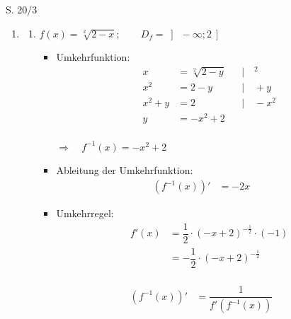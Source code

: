 \begin{Exercise}{S. 20/3}{}
    \begin{enumerate}
        \item [3.]\begin{enumerate}[label=\alph*)]
            \item[a)] {
                $f(x) = \sqrt[2]{2 -x}; \qquad D_{f} = \left] \ -\infty; 2 \ \right]$\\[-2.0ex]
                \begin{itemize}[leftmargin=*]
                    \item Umkehrfunktion: \\{
                        \vspace{-2.0ex}
                        \begin{align*}
                            x &= \sqrt[2]{2 -y} &&| \quad ^{2}\\[1.5ex]
                            x^{2} &= 2 - y &&| \quad +y\\[1.5ex]
                            x^{2} + y &= 2 &&| \quad -x^{2}\\[1.5ex]
                            y &= -x^{2} + 2 &&
                        \end{align*}\\[-2.0ex]
                        $\Rightarrow \quad f^{-1}(x) = -x^{2} + 2$\\[-2.0ex]
                        }
                    \item Ableitung der Umkehrfunktion: \\[-2.0ex]{
                        \begin{align*}
                            \left(f^{-1}(x)\right)' &= -2x &&
                        \end{align*}
                        }
                    \item Umkehrregel: \\[-2.0ex]{
                        \begin{align*}
                            f'(x) &= \dfrac{1}{2} \cdot \left(-x + 2\right)^{-\frac{1}{2}} \cdot (-1) \\[1.5ex]
                            &= -\dfrac{1}{2} \cdot \left(-x + 2\right)^{-\frac{1}{2}}
                        \end{align*}\\[-2.0ex]
                        \begin{align*}
                            \left(f^{-1}(x)\right)' &= \dfrac{1}{f'(f^{-1}(x))} && \\[2.0ex]

\end{align*}}
\end{itemize}}
\end{enumerate}
\end{enumerate}
\end{Exercise}
